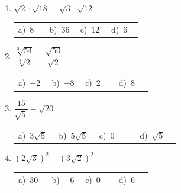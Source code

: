 \documentclass[11pt,a4paper]{article}
\begin{document}
\begin{enumerate}[label=\textbf{\arabic*.},leftmargin=*,itemsep=11pt,topsep=0pt]
\item \begin{minipage}[t]{\linewidth}
$\displaystyle \sqrt{2}\cdot\sqrt{18}+\sqrt{3}\cdot\sqrt{12}$

\vspace{5pt}
\begin{tabular}{@{}p{0.23\linewidth}p{0.23\linewidth}p{0.23\linewidth}p{0.23\linewidth}@{}}
a)~$\displaystyle 8$ & b)~$\displaystyle 36$ & c)~$\displaystyle 12$ & d)~$\displaystyle 6$ \\
\end{tabular}
\end{minipage}

\item \begin{minipage}[t]{\linewidth}
$\displaystyle \dfrac{\sqrt[3]{54}}{\sqrt[3]{2}}-\dfrac{\sqrt{50}}{\sqrt{2}}$

\vspace{5pt}
\begin{tabular}{@{}p{0.23\linewidth}p{0.23\linewidth}p{0.23\linewidth}p{0.23\linewidth}@{}}
a)~$\displaystyle -2$ & b)~$\displaystyle -8$ & c)~$\displaystyle 2$ & d)~$\displaystyle 8$ \\
\end{tabular}
\end{minipage}

\item \begin{minipage}[t]{\linewidth}
$\displaystyle \dfrac{15}{\sqrt{5}}-\sqrt{20}$

\vspace{5pt}
\begin{tabular}{@{}p{0.23\linewidth}p{0.23\linewidth}p{0.23\linewidth}p{0.23\linewidth}@{}}
a)~$\displaystyle 3\sqrt{5}$ & b)~$\displaystyle 5\sqrt{5}$ & c)~$\displaystyle 0$ & d)~$\displaystyle \sqrt{5}$ \\
\end{tabular}
\end{minipage}

\item \begin{minipage}[t]{\linewidth}
$\displaystyle \left(2\sqrt{3}\right)^{2}-\left(3\sqrt{2}\right)^{2}$

\vspace{5pt}
\begin{tabular}{@{}p{0.23\linewidth}p{0.23\linewidth}p{0.23\linewidth}p{0.23\linewidth}@{}}
a)~$\displaystyle 30$ & b)~$\displaystyle -6$ & c)~$\displaystyle 0$ & d)~$\displaystyle 6$ \\
\end{tabular}
\end{minipage}


\end{enumerate}
\end{document}
